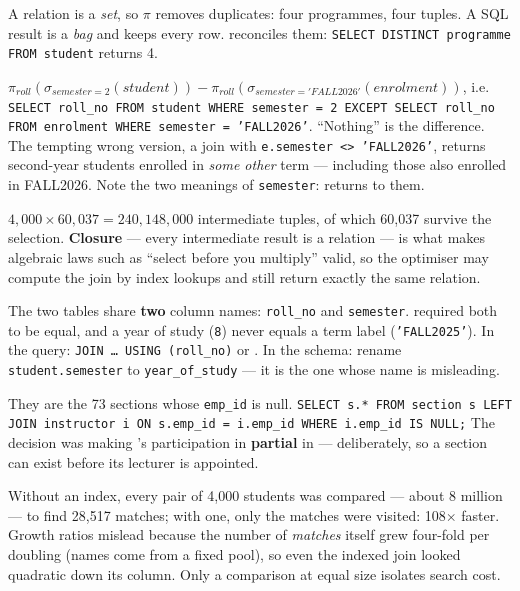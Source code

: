 \begin{ans}
  \item A relation is a \emph{set}, so $\pi$ removes duplicates: four
        programmes, four tuples. A SQL result is a \emph{bag} and keeps every
        row.  reconciles them:
        \texttt{SELECT DISTINCT programme FROM student} returns 4.
  \item $\pi_{roll}(\sigma_{semester=2}(\mathit{student})) -
        \pi_{roll}(\sigma_{semester='FALL2026'}(\mathit{enrolment}))$, i.e.
        \texttt{SELECT roll\_no FROM student WHERE semester = 2 EXCEPT SELECT
        roll\_no FROM enrolment WHERE semester = 'FALL2026'}. ``Nothing'' is the
        difference. The tempting wrong version, a join with
        \texttt{e.semester <> 'FALL2026'}, returns second-year students enrolled
        in \emph{some other} term --- including those also enrolled in
        FALL2026. Note the two meanings of \texttt{semester}: 
        returns to them.
  \item $4{,}000 \times 60{,}037 = 240{,}148{,}000$ intermediate tuples, of
        which 60{,}037 survive the selection. \textbf{Closure} --- every
        intermediate result is a relation --- is what makes algebraic laws such
        as ``select before you multiply'' valid, so the optimiser may compute
        the join by index lookups and still return exactly the same relation.
\end{ans}

\begin{ans}
  \item The two tables share \textbf{two} column names: \texttt{roll\_no} and
        \texttt{semester}.  required both to be equal, and
        a year of study (\texttt{8}) never equals a term label
        (\texttt{'FALL2025'}). In the query: \texttt{JOIN \dots\ USING
        (roll\_no)} or . In the schema: rename
        \texttt{student.semester} to \texttt{year\_of\_study} --- it is the one
        whose name is misleading.
  \item They are the 73 sections whose \texttt{emp\_id} is null.
        \texttt{SELECT s.* FROM section s LEFT JOIN instructor i ON
        s.emp\_id = i.emp\_id WHERE i.emp\_id IS NULL;} The decision was making
        's participation in  \textbf{partial} in
         --- deliberately, so a section can exist before its
        lecturer is appointed.
  \item Without an index, every pair of 4{,}000 students was compared ---
        about 8 million --- to find 28{,}517 matches; with one, only the
        matches were visited: 108$\times$ faster. Growth ratios mislead because
        the number of \emph{matches} itself grew four-fold per doubling (names
        come from a fixed pool), so even the indexed join looked quadratic down
        its column. Only a comparison at equal size isolates search cost.
\end{ans}

